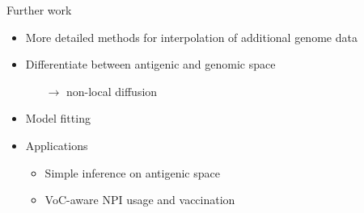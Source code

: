 \documentclass{beamer}
\begin{document}
\begin{frame}{Further work}
    \begin{itemize}
        \item More detailed methods for interpolation of additional genome data
        \item Differentiate between antigenic and genomic space
        \begin{itemize}
            \item[$\rightarrow$] non-local diffusion
        \end{itemize}
        \item Model fitting
        \item Applications
        \begin{itemize}
            \item Simple inference on antigenic space
            \item VoC-aware NPI usage and vaccination
        \end{itemize}
    \end{itemize}
\end{frame}

    
    
\end{document}
